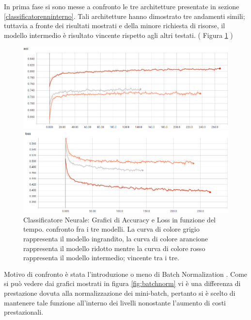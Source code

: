 In prima fase si sono messe a confronto le tre architetture presentate in sezione \ref{classificatorenninterno}. Tali architetture hanno dimostrato tre andamenti simili; tuttavia a fronte dei risultati mostrati e della minore richiesta di risorse, il modello intermedio è risultato vincente rispetto agli altri testati. ( Figura \ref{fig:cfrmlp} )



\begin{figure}[!bp] 
\centering
	\begin{minipage}[t]{\linewidth}
		\includegraphics[width=\linewidth]{figures/MLP1.png}
	\end{minipage}\hfill
	\begin{minipage}[b]{\linewidth}
		\includegraphics[width=\linewidth]{figures/MLP2.png}
	\end{minipage}
	\caption{Classificatore Neurale: Grafici di Accuracy e Loss  in funzione del tempo. confronto fra i tre modelli. La curva di colore grigio rappresenta il modello ingrandito, la curva di colore arancione rappresenta il modello ridotto mentre la curva di colore rosso rappresenta il modello intermedio; vincente tra i tre. \label{fig:cfrmlp}}
\end{figure}

Motivo di confronto è stata l'introduzione o meno di Batch Normalization \cite{1502.03167}. Come si può vedere dai grafici mostrati in figura \ref{fig:batchnorm} vi è una differenza di prestazione dovuta alla normalizzazione dei mini-batch, pertanto si è scelto di mantenere tale funzione all'interno dei livelli nonostante l'aumento di costi prestazionali.


